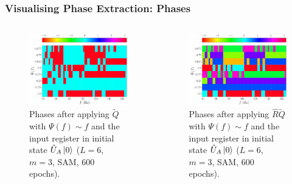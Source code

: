 \documentclass{beamer}
\begin{document}
\begin{frame}
\frametitle{Visualising Phase Extraction: Phases}
\begin{columns}
\begin{column}{0.5\textwidth}
\begin{figure}
\centering 
\includegraphics[width=\textwidth]{im/Q_phase_linear_UA}
\caption{Phases after applying $\tilde{Q}$ with $\Psi(f) \sim f$ and the input register in initial state $\hat{U}_A \ket{0}$ ($L=6$, $m=3$, SAM, 600 epochs).}
\end{figure}
\end{column}
\begin{column}{0.5\textwidth}
\begin{figure}
\centering 
\includegraphics[width=\textwidth]{im/RQ_phase_linear_UA}
\caption{Phases after applying $\hat{R}\tilde{Q}$ with $\Psi(f) \sim f$ and the input register in initial state $\hat{U}_A \ket{0}$ ($L=6$, $m=3$, SAM, 600 epochs).}
\end{figure}
\end{column}
\end{columns}
\end{frame}
\end{document}
